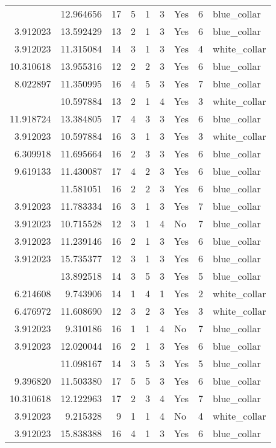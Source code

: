 \documentclass[
]{article}
\begin{document}
\begin{longtable}[t]{rrrrrllrl}
\addlinespace
3.912023 & 12.964656 & 17 & 5 & 1 & 3 & Yes & 6 & blue\_collar\\
3.912023 & 13.592429 & 13 & 2 & 1 & 3 & Yes & 6 & blue\_collar\\
3.912023 & 11.315084 & 14 & 3 & 1 & 3 & Yes & 4 & white\_collar\\
10.310618 & 13.955316 & 12 & 2 & 2 & 3 & Yes & 6 & blue\_collar\\
8.022897 & 11.350995 & 16 & 4 & 5 & 3 & Yes & 7 & blue\_collar\\
\addlinespace
3.912023 & 10.597884 & 13 & 2 & 1 & 4 & Yes & 3 & white\_collar\\
11.918724 & 13.384805 & 17 & 4 & 3 & 3 & Yes & 6 & blue\_collar\\
3.912023 & 10.597884 & 16 & 3 & 1 & 3 & Yes & 3 & white\_collar\\
6.309918 & 11.695664 & 16 & 2 & 3 & 3 & Yes & 6 & blue\_collar\\
9.619133 & 11.430087 & 17 & 4 & 2 & 3 & Yes & 6 & blue\_collar\\
\addlinespace
8.022897 & 11.581051 & 16 & 2 & 2 & 3 & Yes & 6 & blue\_collar\\
3.912023 & 11.783334 & 16 & 3 & 1 & 3 & Yes & 7 & blue\_collar\\
3.912023 & 10.715528 & 12 & 3 & 1 & 4 & No & 7 & blue\_collar\\
3.912023 & 11.239146 & 16 & 2 & 1 & 3 & Yes & 6 & blue\_collar\\
3.912023 & 15.735377 & 12 & 3 & 1 & 3 & Yes & 6 & blue\_collar\\
\addlinespace
10.597884 & 13.892518 & 14 & 3 & 5 & 3 & Yes & 5 & blue\_collar\\
6.214608 & 9.743906 & 14 & 1 & 4 & 1 & Yes & 2 & white\_collar\\
6.476972 & 11.608690 & 12 & 3 & 2 & 3 & Yes & 3 & white\_collar\\
3.912023 & 9.310186 & 16 & 1 & 1 & 4 & No & 7 & blue\_collar\\
3.912023 & 12.020044 & 16 & 2 & 1 & 3 & Yes & 6 & blue\_collar\\
\addlinespace
7.843849 & 11.098167 & 14 & 3 & 5 & 3 & Yes & 5 & blue\_collar\\
9.396820 & 11.503380 & 17 & 5 & 5 & 3 & Yes & 6 & blue\_collar\\
10.310618 & 12.122963 & 17 & 2 & 3 & 4 & Yes & 7 & blue\_collar\\
3.912023 & 9.215328 & 9 & 1 & 1 & 4 & No & 4 & white\_collar\\
3.912023 & 15.838388 & 16 & 4 & 1 & 3 & Yes & 6 & blue\_collar\\

\end{longtable}
\end{document}
